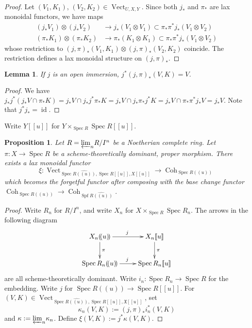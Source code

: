 \documentclass[11pt]{amsart}
\newtheorem{lem}{Lemma}
\newtheorem{prop}{Proposition}
\numberwithin{thm}{section}
\numberwithin{lem}{section}
\numberwithin{cor}{section}
\numberwithin{prop}{section}
\numberwithin{exam}{section}
\numberwithin{dfn}{section}
\newcommand{\wh}[1]{\widehat{#1}}
\newcommand{\id}{\operatorname{id}}
\newcommand{\Vect}{\operatorname{Vect}}
\newcommand{\Coh}{\operatorname{Coh}}
\newcommand{\spf}{\operatorname{Spf}}
\newcommand{\spec}{\operatorname{Spec}}
\newcommand{\invlim}[1]{{\varprojlim_{#1}}}
\begin{document}
\begin{appendices}
\begin{proof}
Let $(V_1, K_1)$, $(V_2, K_2)\in \Vect_{U, X, Y}$.
Since both $j_*$ and $\pi_*$ are lax monoidal functors,
we have maps
\begin{align*}
(j_*V_1) \otimes (j_*V_2) &\to j_*(V_1\otimes V_1) \subset \pi_*\pi^*j_*(V_1\otimes V_2)\\
(\pi_*K_1) \otimes (\pi_*K_2) &\to \pi_*(K_1\otimes K_1) \subset \pi_*\pi^*j_*(V_1\otimes V_2)
\end{align*}
whose restriction to $(j, \pi)_*(V_1, K_1)\otimes (j,\pi)_*(V_2, K_2)$
coincide.
The restriction defines a lax monoidal structure on $(j, \pi)_*$.
\end{proof}

\begin{lem}
\label{lem:fun-ext-2}
If $j$ is an open immersion, $j^*(j, \pi)_*(V, K)=V$.
\end{lem}

\begin{proof}
We have $j_*j^*(j_* V\cap \pi_*K) = j_*V \cap j_*j^*\pi_*K
=j_*V\cap j_*\pi_*j^*K = j_*V \cap \pi_*\pi^*j_*V=j_*V$.
Note that $j^*j_*=\id$.
\end{proof}

Write $Y[\![u]\!]$ for $Y\times_{\spec R} \spec R[\![u]\!]$.

\begin{prop}
\label{prop:decomp}
Let $R = \invlim{n} R/I^n$ be a Noetherian complete ring.
Let $\pi:X\to \spec R$ be
a scheme-theoretically dominant, proper morphism.
There exists a lax monoidal functor
$$
\xi:\Vect_{\spec \wh{R(\!(u)\!)}, \spec{R[\![u]\!]}, X[\![u]\!]}
\to \Coh_{\spec R(\!(u)\!)}
$$
which becomes the forgetful functor
after composing with the base change functor
$\Coh_{\spec R(\!(u)\!)}\to \Coh_{\spf \wh{R(\!(u)\!)}}$.
\end{prop}

\begin{proof}
Write $R_n$ for $R/I^n$, and
write $X_n$ for $X\times_{\spec R}\spec R_n$.
The arrows in the following diagram
$$
\xymatrix{
    X_n(\!(u)\!) \ar[d]^\pi \ar[r]^j & X_n[\![u]\!] \ar[d]^\pi\\
    \spec R_n(\!(u)\!) \ar[r]^j & \spec R_n[\![u]\!]
}
$$
are all scheme-theoretically dominant.
Write $i_n: \spec R_n \to \spec R$
for the embedding.
Write $j$ for $\spec R(\!(u)\!)\to \spec R[\![u]\!]$.
For $(V, K)\in \Vect_{\spec \wh{R(\!(u)\!)}, \spec{R[\![u]\!]}, \mathfrak{X}[\![u]\!]}$,
set $$\kappa_n(V, K) := (j, \pi)_*i_n^*(V,K)$$ and
$\kappa := \invlim{n} \kappa_n$.
Define $\xi(V, K):=j^* \kappa(V,K).$


\end{proof}
\end{appendices}
\end{document}
